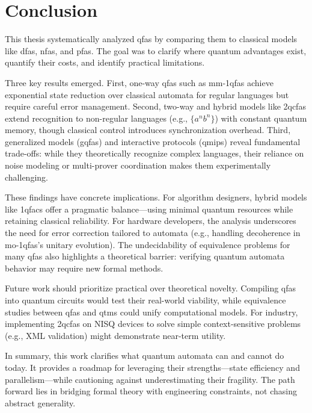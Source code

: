 \chapter{Conclusion}
\label{chap:conclusion}

This thesis systematically analyzed \glspl{qfa} by comparing them to classical models like \glspl{dfa}, \glspl{nfa}, and \glspl{pfa}. The goal was to clarify where quantum advantages exist, quantify their costs, and identify practical limitations.

Three key results emerged. First, one-way \glspl{qfa} such as \glspl{mm-1qfa} achieve exponential state reduction over classical automata for regular languages but require careful error management. Second, two-way and hybrid models like \glspl{2qcfa} extend recognition to non-regular languages (e.g., $\{a^n b^n\}$) with constant quantum memory, though classical control introduces synchronization overhead. Third, generalized models (\glspl{gqfa}) and interactive protocols (\glspl{qmip}) reveal fundamental trade-offs: while they theoretically recognize complex languages, their reliance on noise modeling or multi-prover coordination makes them experimentally challenging.

These findings have concrete implications. For algorithm designers, hybrid models like \glspl{1qfac} offer a pragmatic balance—using minimal quantum resources while retaining classical reliability. For hardware developers, the analysis underscores the need for error correction tailored to automata (e.g., handling decoherence in \glspl{mo-1qfa}'s unitary evolution). The undecidability of equivalence problems for many \glspl{qfa} also highlights a theoretical barrier: verifying quantum automata behavior may require new formal methods.

Future work should prioritize practical over theoretical novelty. Compiling \glspl{qfa} into quantum circuits would test their real-world viability, while equivalence studies between \glspl{qfa} and \glspl{qtm} could unify computational models. For industry, implementing \glspl{2qcfa} on NISQ devices to solve simple context-sensitive problems (e.g., XML validation) might demonstrate near-term utility.

In summary, this work clarifies what quantum automata can and cannot do today. It provides a roadmap for leveraging their strengths—state efficiency and parallelism—while cautioning against underestimating their fragility. The path forward lies in bridging formal theory with engineering constraints, not chasing abstract generality.